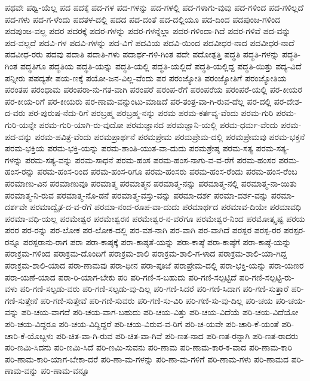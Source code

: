 {ಪಥವೇ
ಪಥ್ವಿ-ಯೆಲ್ಲ
ಪದ
ಪದಕ್ಕೆ
ಪದ-ಗಳ
ಪದ-ಗಳನ್ನು
ಪದ-ಗಳಲ್ಲಿ
ಪದ-ಗಳಾಗು-ವುವು
ಪದ-ಗಳಿಂದ
ಪದ-ಗಳಿಲ್ಲದೆ
ಪದ-ಗಳು
ಪದ-ಗ-ಳೆಂದು
ಪದತಳ-ದಲ್ಲಿ
ಪದದ
ಪದ-ದಂತೆ
ಪದ-ದಲ್ಲಿಯೂ
ಪದ-ದಿಂದ
ಪದಪುಂಜ-ಗಳಿಂದ
ಪದಪುಂಜ-ವಲ್ಲ
ಪದರ
ಪದರಕ್ಕೆ
ಪದರ-ಗಳನ್ನು
ಪದರ-ಗಳನ್ನೆಲ್ಲಾ
ಪದರ-ಗಳಿಂದಾ-ಗಿದೆ
ಪದರ-ಗಳಿವೆ
ಪದ-ವನ್ನು
ಪದ-ವಲ್ಲದೆ
ಪದವಿ-ಗಳ
ಪದವಿ-ಗಳನ್ನು
ಪದ-ವಿಗೆ
ಪದವಿಯ
ಪದವಿ-ಯಿಂದ
ಪದವೀಧರ-ನಾದ
ಪದವೀಧರ-ನಾದೆ
ಪದವೀಧ-ರರು
ಪದವು
ಪದಾತಿ
ಪದಾತಿ-ಗಳು
ಪದಾರ್ಥ-ಗಳಿ-ಗಿಂತ
ಪದೇ
ಪದೋತ್ಪತ್ತಿ
ಪದ್ಧತಿ
ಪದ್ಧತಿ-ಗಳನ್ನು
ಪದ್ಧತಿ-ಗಿಂತ
ಪದ್ಧತಿಗೂ
ಪದ್ಧತಿಯ
ಪದ್ಧತಿ-ಯನ್ನು
ಪದ್ಧತಿ-ಯಲ್ಲಿ
ಪದ್ಧತಿ-ಯಲ್ಲಿದೆ
ಪದ್ಧತಿ-ಯಲ್ಲಿದ್ದ
ಪದ್ಧತಿ-ಯಿತ್ತು
ಪದ್ಯ-ವಿದೆ
ಪನ್ನೀರು
ಪಪದ್ಯತೇ
ಪಯ-ಣಕ್ಕೆ
ಪಯೋ-ಜನ-ವಿಲ್ಲ-ವೆಂದು
ಪರ
ಪರಂಜ್ಯೋತಿ
ಪರಂಜ್ಯೋತಿಗೆ
ಪರಂಜ್ಯೋತಿಯ
ಪರಂತಪ
ಪರಂಧಾಮ
ಪರಂಪರಾ-ನು-ಗತ-ವಾಗಿ
ಪರಂಪರೆ
ಪರಂಪ-ರೆಗೆ
ಪರಂಪರೆಯ
ಪರಂಪರೆ-ಯಲ್ಲಿ
ಪರ-ಕೀಯರ
ಪರ-ಕೀಯ-ರಿಗೆ
ಪರ-ಕೀಯರು
ಪರ-ಣಾಮ-ವನ್ನುಂಟು-ಮಾಡಿದೆ
ಪರ-ತಂತ್ರ-ವಾ-ಗಿ-ರುವ-ದೆಲ್ಲ
ಪರ-ದಲ್ಲಿ
ಪರ-ದೇಶ-ದ-ವರು
ಪರ-ಪುರುಷ-ನೆದು-ರಿಗೆ
ಪರಬ್ರಹ್ಮ
ಪರಬ್ರಹ್ಮ-ನನ್ನು
ಪರಮ
ಪರಮ-ಕರ್ತವ್ಯ-ವೆಂದು
ಪರಮ-ಗುರಿ
ಪರಮ-ಗುರಿ-ಯನ್ನೇ
ಪರಮ-ಗುರಿ-ಯಾಗಿ-ರು-ವುದೋ
ಪರಮಜ್ಞಾನದ
ಪರಮಜ್ಞಾನಿ-ಯಲ್ಲಿ
ಪರಮ-ಧರ್ಮ-ವೆಂದು
ಪರಮ-ಪದ-ವನ್ನು
ಪರಮ-ಪವಿತ್ರ-ವೆಂದು
ಪರಮಪ್ರಾರ್ಥನೆ
ಪರಮಪ್ರೇಮ
ಪರಮಪ್ರೇಮ-ದಲ್ಲಿ
ಪರಮಪ್ರೇಮವು
ಪರಮ-ಭಕ್ತನೆ
ಪರಮ-ಭಕ್ತಿಯ
ಪರಮ-ಭಕ್ತಿ-ಯನ್ನು
ಪರಮ-ಶಾಂತಿ-ಯುತ-ವಾ-ದುದು
ಪರಮಶ್ರೇಷ್ಠ
ಪರಮ-ಸತ್ಯ
ಪರಮ-ಸತ್ಯ-ಗಳನ್ನು
ಪರಮ-ಸತ್ಯ-ವನ್ನು
ಪರಮ-ಸಾಧನೆ
ಪರಮ-ಹಂಸ
ಪರಮ-ಹಂಸ-ನಾಗು-ವ-ವ-ರೆಗೆ
ಪರಮ-ಹಂಸರ
ಪರಮ-ಹಂಸ-ರನ್ನು
ಪರಮ-ಹಂಸ-ರಿಂದ
ಪರಮ-ಹಂಸ-ರಿಗೂ
ಪರಮ-ಹಂಸರು
ಪರಮ-ಹಂಸ-ರೆಂದು
ಪರಮ-ಹಂಸ-ರೆಂಬ
ಪರಮಾಣು-ವಿನ
ಪರಮಾಣುವೂ
ಪರಮಾತ್ಮ
ಪರಮಾತ್ಮನ
ಪರಮಾತ್ಮ-ನನ್ನು
ಪರಮಾತ್ಮ-ನಲ್ಲಿ
ಪರಮಾತ್ಮ-ನಾ-ಯಿತು
ಪರಮಾತ್ಮ-ನಿ-ರುವ
ಪರಮಾತ್ಮ-ನೊ-ಡನೆ
ಪರಮಾತ್ಮ-ವಸ್ತು-ವನ್ನು
ಪರಮಾ-ದರ್ಶ
ಪರಮಾ-ದರ್ಶ-ವನ್ನು
ಪರಮಾ-ದರ್ಶವೇ
ಪರಮಾದ್ವೈತ-ದ-ವ-ರೆಗೆ
ಪರಮಾ-ನಂದ-ರೂಪ-ವಾ-ದುದು
ಪರಮಾರ್ಥದ
ಪರಮಾವ-ದಿಯೇ
ಪರಮಾವಧಿ
ಪರಮಾ-ವಧಿ-ಯಲ್ಲ
ಪರಮೇಶ್ವರ
ಪರಮೇಶ್ವರನ
ಪರಮೇಶ್ವರ-ನ-ವರೆಗೂ
ಪರಮೇಶ್ವರ-ನಿಂದ
ಪರಮೋತ್ಕೃಷ್ಟ
ಪರಯ
ಪರರ
ಪರ-ರನ್ನು
ಪರ-ಲೋಕ
ಪರ-ಲೋಕ-ದಲ್ಲಿ
ಪರ-ವಶ-ನಾಗಿ
ಪರ-ವಾಗಿ
ಪರ-ವಾಗಿದೆ
ಪರಸ್ಪರ
ಪರಸ್ಪ-ರರ
ಪರಸ್ಪರ-ರನ್ನೂ
ಪರಸ್ಪರಾನು-ರಾಗ
ಪರಾ
ಪರಾ-ಕಾಷ್ಠಕ್ಕೆ
ಪರಾ-ಕಾಷ್ಠತೆ-ಯನ್ನು
ಪರಾ-ಕಾಷ್ಠೆ
ಪರಾ-ಕಾಷ್ಠೆಗೆ
ಪರಾ-ಕಾಷ್ಠೆ-ಯನ್ನು
ಪರಾಕ್ರಮ-ಗಳಿಂದ
ಪರಾಕ್ರಮ-ದೊಂದಿಗೆ
ಪರಾಕ್ರಮ-ಶಾಲಿ
ಪರಾಕ್ರಮ-ಶಾಲಿ-ಗ-ಳಾದ
ಪರಾಕ್ರಮ-ಶಾಲಿ-ಯಾ-ಗಿದ್ದ
ಪರಾಕ್ರಮ-ಶಾಲಿ-ಯಾದ
ಪರಾ-ಣಾಮವು
ಪರಾ-ಧೀನ
ಪರಾ-ಪೂಜೆ
ಪರಾಪ್ರೇಮ-ದಲ್ಲಿ
ಪರಾ-ಭಕ್ತಿ-ಯನ್ನು
ಪರಾ-ಯಣರ
ಪರಾ-ಯಣೆ-ಯಾದ
ಪರಾ-ರಿ-ಯಾಗ-ಬೇಕು
ಪರಿ
ಪರಿ-ಗಣಿ-ಸ-ಬಹುದು
ಪರಿ-ಗಣಿ-ಸಲ್ಪಟ್ಟಿದೆ
ಪರಿ-ಗಣಿ-ಸಲ್ಪಟ್ಟಿ-ರು-ವಳು
ಪರಿ-ಗಣಿ-ಸಲ್ಪಡು-ವರು
ಪರಿ-ಗಣಿ-ಸಲ್ಪಡು-ವು-ದಿಲ್ಲ
ಪರಿ-ಗಣಿ-ಸಿದರೆ
ಪರಿ-ಗಣಿ-ಸಿದಾಗ
ಪರಿ-ಗಣಿ-ಸುತ್ತಾರೆ
ಪರಿ-ಗಣಿ-ಸುತ್ತೇನೆ
ಪರಿ-ಗಣಿ-ಸುತ್ತೇವೆ
ಪರಿ-ಗಣಿ-ಸುವರು
ಪರಿ-ಗಣಿ-ಸು-ವಿರಿ
ಪರಿ-ಗಣಿ-ಸು-ವು-ದಿಲ್ಲ
ಪರಿ-ಚಯ
ಪರಿ-ಚಯ-ವನ್ನು
ಪರಿ-ಚಯ-ವಾಗದೆ
ಪರಿ-ಚಯ-ವಾಗ-ಬಹುದು
ಪರಿ-ಚಯ-ವಿತ್ತು
ಪರಿ-ಚಯ-ವಿದೆಯೆ
ಪರಿ-ಚಯ-ವಿದೆಯೋ
ಪರಿ-ಚಯ-ವಿದ್ದರೂ
ಪರಿ-ಚಯ-ವಿದ್ದಿದ್ದರೆ
ಪರಿ-ಚಯ-ವಿರುವ-ವ-ರಿಗೆ
ಪರಿ-ಚ-ಯವೇ
ಪರಿ-ಚಾರಿ-ಕೆ-ಯಂತೆ
ಪರಿ-ಚಾರಿ-ಕೆ-ಯೊಬ್ಬಳು
ಪರಿ-ಚಿತ-ವಾ-ಗಿ-ರುವ
ಪರಿ-ಚಿತ-ವಾ-ಗಿವೆ
ಪರಿ-ಣತ-ನಾದ
ಪರಿ-ಣತ-ರನ್ನಾಗಿ
ಪರಿ-ಣತ-ರಾದರು
ಪರಿ-ಣಮಿ-ಸಿದನು
ಪರಿ-ಣಮಿ-ಸಿದೆ
ಪರಿ-ಣಮಿ-ಸುವನು
ಪರಿ-ಣಾಮ
ಪರಿ-ಣಾಮ-ಕಾರ-ಕ-ವಾದ
ಪರಿ-ಣಾಮ-ಕಾರಿ
ಪರಿ-ಣಾಮ-ಕಾರಿ-ಯಾಗ-ಬೇಕಾ-ದರೆ
ಪರಿ-ಣಾ-ಮ-ಗಳನ್ನು
ಪರಿ-ಣಾ-ಮ-ಗಳಿಗೆ
ಪರಿ-ಣಾಮ-ಗಳು
ಪರಿ-ಣಾಮದ
ಪರಿ-ಣಾಮ-ವನ್ನು
ಪರಿ-ಣಾಮ-ವನ್ನೂ
}

